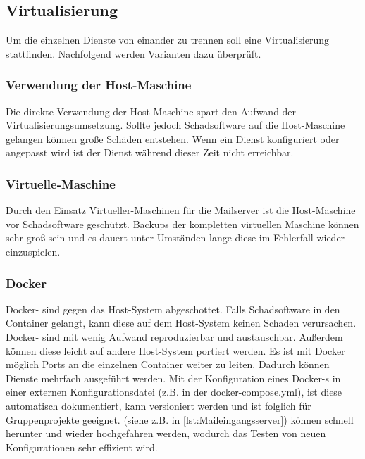 \documentclass[a4paper,11pt,singlespacing]{article}
\begin{document}
	\subsection{Virtualisierung}\label{sec:Virtualisierung}
		Um die einzelnen Dienste von einander zu trennen soll eine Virtualisierung stattfinden.
		Nachfolgend werden Varianten dazu überprüft.

		\subsubsection{Verwendung der Host-Maschine}\label{Verwendung der Host-Maschine}
			Die direkte Verwendung der Host-Maschine spart den Aufwand der Virtualisierungsumsetzung.
			Sollte jedoch Schadsoftware auf die Host-Maschine gelangen können gro{\ss}e Schäden entstehen.
			Wenn ein Dienst konfiguriert oder angepasst wird ist der Dienst während dieser Zeit nicht erreichbar.

		\subsubsection{Virtuelle-Maschine}\label{Virtual-Maschine}
			Durch den Einsatz Virtueller-Maschinen für die Mailserver ist die Host-Maschine vor Schadsoftware geschützt.
			Backups der kompletten virtuellen Maschine können sehr groß sein und es dauert unter Umständen lange diese im Fehlerfall wieder einzuspielen.

		\subsubsection{Docker}\label{Docker}
			Docker- sind gegen das Host-System abgeschottet. Falls Schadsoftware in den Container gelangt, kann diese auf dem Host-System keinen Schaden verursachen.
			Docker- sind mit wenig Aufwand reproduzierbar und austauschbar. Au{\ss}erdem können diese leicht auf andere Host-System portiert werden.
			Es ist mit Docker möglich Ports an die einzelnen Container weiter zu leiten. Dadurch können Dienste mehrfach ausgeführt werden.
			Mit der Konfiguration eines Docker-s in einer externen Konfigurationsdatei (z.B. in der docker-compose.yml), ist diese automatisch dokumentiert, kann versioniert werden und ist folglich für Gruppenprojekte geeignet. (siehe z.B. in \autoref{lst:Maileingangsserver})
			 können schnell herunter und wieder hochgefahren werden, wodurch das Testen von neuen Konfigurationen sehr effizient wird.
\end{document}
